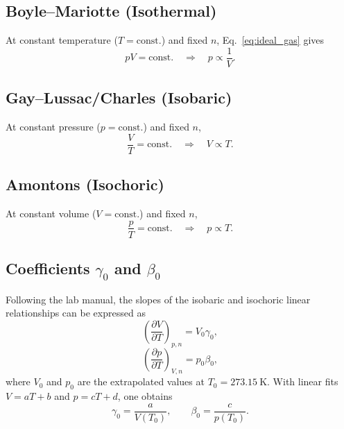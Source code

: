 \documentclass[journal]{IEEEtran}
\begin{document}
\subsection{Boyle--Mariotte (Isothermal)}
At constant temperature ($T=\mathrm{const.}$) and fixed $n$, Eq.~\eqref{eq:ideal_gas} gives
\begin{equation}
	pV = \mathrm{const.}\quad\Rightarrow\quad p \propto \frac{1}{V}.
	\label{eq:boyle}
\end{equation}

\subsection{Gay--Lussac/Charles (Isobaric)}
At constant pressure ($p=\mathrm{const.}$) and fixed $n$,
\begin{equation}
	\frac{V}{T} = \mathrm{const.}\quad\Rightarrow\quad V \propto T.
	\label{eq:charles}
\end{equation}

\subsection{Amontons (Isochoric)}
At constant volume ($V=\mathrm{const.}$) and fixed $n$,
\begin{equation}
	\frac{p}{T} = \mathrm{const.}\quad\Rightarrow\quad p \propto T.
	\label{eq:amontons}
\end{equation}

\subsection{\texorpdfstring{Coefficients $\gamma_0$ and $\beta_0$}{Coefficients gamma0 and beta0}}
Following the lab manual, the slopes of the isobaric and isochoric linear relationships can be expressed as \cite{lab_manual}
\begin{equation}
	\left(\frac{\partial V}{\partial T}\right)_{p,n} = V_0\gamma_0,
	\label{eq:gamma_def}
\end{equation}
\begin{equation}
	\left(\frac{\partial p}{\partial T}\right)_{V,n} = p_0\beta_0,
	\label{eq:beta_def}
\end{equation}
where $V_0$ and $p_0$ are the extrapolated values at $T_0=\SI{273.15}{\kelvin}$. With linear fits $V=aT+b$ and $p=cT+d$, one obtains
\begin{equation}
	\gamma_0 = \frac{a}{V(T_0)},\qquad \beta_0 = \frac{c}{p(T_0)}.
	\label{eq:gamma_beta_from_fit}
\end{equation}
\end{document}
